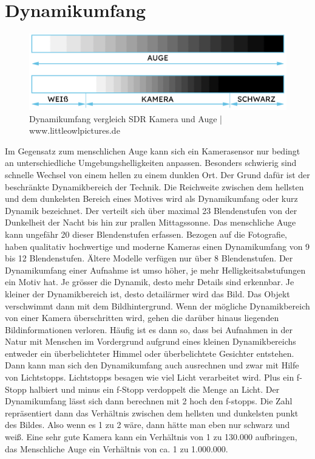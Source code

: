 \documentclass[11pt, a4paper, twocolumn]{article}
\begin{document}
	\section{Dynamikumfang}
	\begin{figure}[H]
		\centering
		\includegraphics[scale=0.11]{img/dynamikumfang.png}
		\caption{Dynamikumfang vergleich SDR Kamera und Auge | www.littleowlpictures.de}
	\end{figure}
	Im Gegensatz zum menschlichen Auge kann sich ein Kamerasensor nur bedingt an unterschiedliche Umgebungshelligkeiten anpassen. Besonders schwierig sind schnelle Wechsel von einem hellen zu einem dunklen Ort. Der Grund dafür ist der beschränkte Dynamikbereich der Technik.
	Die Reichweite zwischen dem hellsten und dem dunkelsten Bereich eines Motives wird als Dynamikumfang oder kurz Dynamik bezeichnet. Der verteilt sich über maximal 23 Blendenstufen von der Dunkelheit der Nacht bis hin zur prallen Mittagssonne. Das menschliche Auge kann ungefähr 20 dieser Blendenstufen erfassen. Bezogen auf die Fotografie, haben qualitativ hochwertige und moderne Kameras einen Dynamikumfang von 9 bis 12 Blendenstufen. Ältere Modelle verfügen nur über 8 Blendenstufen.
	Der Dynamikumfang einer Aufnahme ist umso höher, je mehr Helligkeitsabstufungen ein Motiv hat. Je grösser die Dynamik, desto mehr Details sind erkennbar. Je kleiner der Dynamikbereich ist, desto detailärmer wird das Bild. Das Objekt verschwimmt dann mit dem Bildhintergrund.
	Wenn der mögliche Dynamikbereich von einer Kamera überschritten wird, gehen die darüber hinaus liegenden Bildinformationen verloren. Häufig ist es dann so, dass bei Aufnahmen in der Natur mit Menschen im Vordergrund aufgrund eines kleinen Dynamikbereichs entweder ein überbelichteter Himmel oder überbelichtete Gesichter entstehen. 
	Dann kann man sich den Dynamikumfang auch ausrechnen und zwar mit Hilfe von Lichtstopps. Lichtstopps besagen wie viel Licht verarbeitet wird. Plus ein f-Stopp halbiert und minus ein f-Stopp verdoppelt die Menge an Licht. Der Dynamikumfang lässt sich dann berechnen mit 2 hoch den f-stopps. Die Zahl repräsentiert dann das Verhältnis zwischen dem hellsten und dunkelsten punkt des Bildes. Also wenn es 1 zu 2 wäre, dann hätte man eben nur schwarz und weiß. Eine sehr gute Kamera kann ein Verhältnis von 1 zu 130.000 aufbringen, das Menschliche Auge ein Verhältnis von ca. 1 zu 1.000.000.
\end{document}

